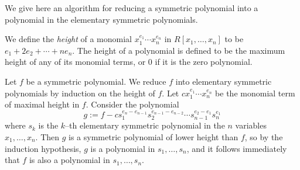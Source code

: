 \documentclass{article}
\begin{document}
We give here an algorithm for reducing a symmetric polynomial into a polynomial in the elementary symmetric polynomials.

We define the {\em height} of a monomial $x_1^{e_1} \cdots x_n^{e_n}$ in $R[x_1,\dots,x_n]$ to be $e_1 + 2 e_2 + \cdots + n e_n$. The height of a polynomial is defined to be the maximum height of any of its monomial terms, or 0 if it is the zero polynomial.

Let $f$ be a symmetric polynomial. We reduce $f$ into elementary symmetric polynomials by induction on the height of $f$. Let $c x_1^{e_1} \cdots x_n^{e_n}$ be the monomial term of maximal height in $f$. Consider the polynomial
$$
g := f - c s_1^{e_n - e_{n-1}} s_2^{e_{n-1} - e_{n-2}} \cdots s_{n-1}^{e_2 - e_1} s_n^{e_1}
$$
where $s_k$ is the $k$--th elementary symmetric polynomial in the $n$ variables $x_1, \dots, x_n$. Then $g$ is a symmetric polynomial of lower height than $f$, so by the induction hypothesis, $g$ is a polynomial in $s_1, \dots, s_n$, and it follows immediately that $f$ is also a polynomial in $s_1, \dots, s_n$.
\end{document}
